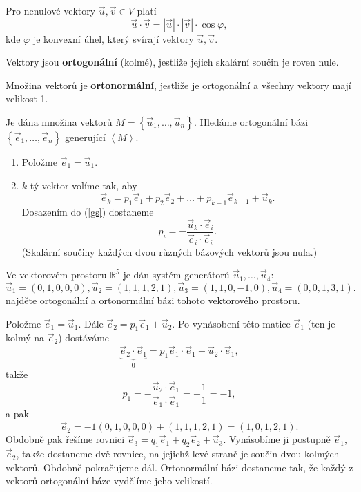 \begin{veta}
    Pro nenulové vektory $\vec u, \vec v \in V$ platí
    $$\vec u \cdot \vec v = |\vec u|\cdot |\vec v|\cdot \cos \varphi,$$
    kde $\varphi$ je konvexní úhel, který svírají vektory $\vec u, \vec v.$
\end{veta}

\begin{definition}
    Vektory jsou \textbf{ortogonální} (kolmé), jestliže jejich skalární součin
    je roven nule.
\end{definition}

\begin{definition}
    Množina vektorů je \textbf{ortonormální}, jestliže je ortogonální a všechny vektory mají
    velikost 1.
\end{definition}

\begin{veta}
    Je dána množina vektorů $M=\left \{ \vec u_1,\dots, \vec u_n \right \}$.
    Hledáme ortogonální bázi $\left \{ \vec e_1, \dots, \vec e_n \right \}$
    generující $\left < M \right >.$
    \begin{enumerate}[1.]
    \item Položme $\vec e_1 = \vec u_1.$
   	\item $k$-tý vektor volíme tak, aby
    \begin{equation}\label{gs}
    \vec e_k = p_1\vec e_1 + p_2\vec e_2 + \dots +p_{k-1} \vec e_{k-1} + \vec u_k.
    \end{equation}
    Dosazením do (\ref{gs}) dostaneme
    $$p_i = -\frac{\vec u_k\cdot \vec e_i}{\vec e_i\cdot \vec e_i}.$$
    (Skalární součiny každých dvou různých bázových vektorů jsou nula.)
    \end{enumerate}
\end{veta}

\begin{priklad}
Ve vektorovém prostoru $\mathbb R^5$ je dán systém generátorů $\vec u_1,\dots,\vec u_4$:
$$
    \vec u_1 = (0,1,0,0,0), \vec u_2 = (1,1,1,2,1), \vec u_3 = (1,1,0,-1,0), \vec u_4 = (0,0,1,3,1).
$$
najděte ortogonální a ortonormální bázi tohoto vektorového prostoru.
\end{priklad}

\begin{reseni}
Položme $\vec e_1=\vec u_1.$ Dále $\vec e_2 = p_1\vec e_1 + \vec u_2$. Po vynásobení
této matice $\vec e_1$ (ten je kolmý na $\vec e_2$) dostáváme
$$\underbrace{\vec e_2\cdot \vec e_1}_{0}=p_1\vec e_1\cdot\vec e_1+\vec u_2\cdot\vec e_1,$$
takže
$$p_1=-\frac{\vec u_2\cdot\vec e_1}{\vec e_1\cdot\vec e_1} = -\frac{1}{1}=-1,$$
a pak
$$\vec e_2 = -1(0,1,0,0,0)+(1,1,1,2,1)=(1,0,1,2,1).$$
Obdobně pak řešíme rovnici $\vec e_3=q_1\vec e_1 + q_2\vec e_2 + \vec u_3$. Vynásobíme
ji postupně $\vec e_1$, $\vec e_2$, takže dostaneme dvě rovnice, na jejichž levé straně
je součin dvou kolmých vektorů. Obdobně pokračujeme dál. Ortonormální bázi
dostaneme tak, že každý z vektorů ortogonální báze vydělíme jeho velikostí.
\end{reseni}

